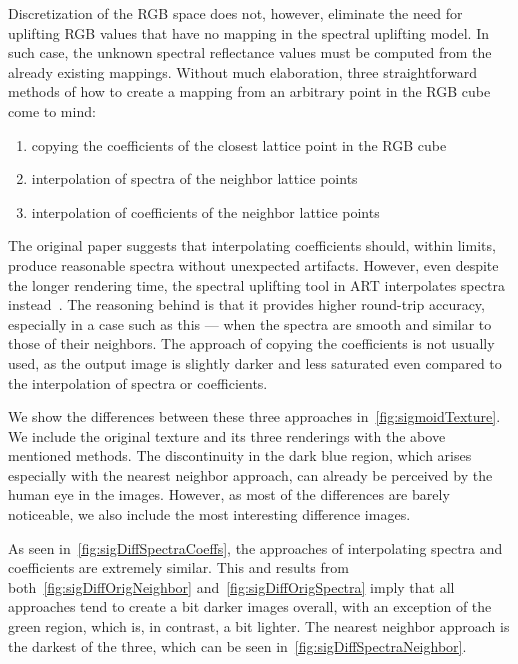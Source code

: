 Discretization of the RGB space does not, however, eliminate the need for uplifting RGB values that have no mapping in the spectral uplifting model. In such case, the unknown spectral reflectance values must be computed from the already existing mappings. Without much elaboration, three straightforward methods of how to create a mapping from an arbitrary point in the RGB cube come to mind:
\begin{enumerate}
	\item copying the coefficients of the closest lattice point in the RGB cube
	\item interpolation of spectra of the neighbor lattice points
	\item interpolation of coefficients of the neighbor lattice points
\end{enumerate}
The original paper suggests that interpolating coefficients should, within limits, produce reasonable spectra without unexpected artifacts. However, even despite the longer rendering time, the spectral uplifting tool in ART interpolates spectra instead~\cite{ARTsigmoids}. The reasoning behind is that it provides higher round-trip accuracy, especially in a case such as this --- when the spectra are smooth and similar to those of their neighbors. The approach of copying the coefficients is not usually used, as the output image is slightly darker and less saturated even compared to the interpolation of spectra or coefficients.

We show the differences between these three approaches in~\cref{fig:sigmoidTexture}. We include the original texture and its three renderings with the above mentioned methods. The discontinuity in the dark blue region, which arises especially with the nearest neighbor approach, can already be perceived by the human eye in the images. However, as most of the differences are barely noticeable, we also include the most interesting difference images.

As seen in~\cref{fig:sigDiffSpectraCoeffs}, the approaches of interpolating spectra and coefficients are extremely similar. This and results from both~\cref{fig:sigDiffOrigNeighbor} and~\cref{fig:sigDiffOrigSpectra} imply that all approaches tend to create a bit darker images overall, with an exception of the green region, which is, in contrast, a bit lighter. The nearest neighbor approach is the darkest of the three, which can be seen in~\cref{fig:sigDiffSpectraNeighbor}.


